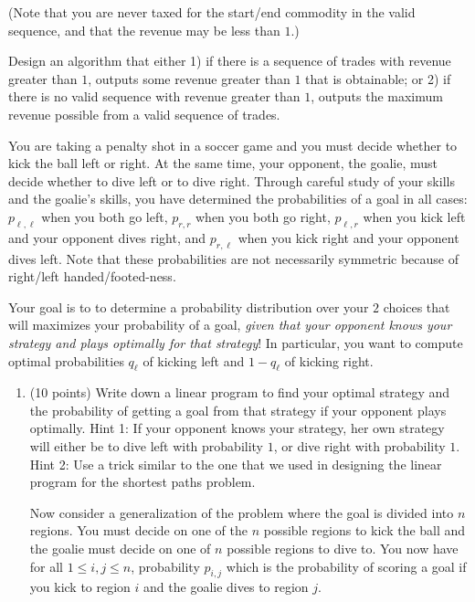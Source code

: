 \documentclass[11pt]{article}
\begin{document}
\begin{enumerate}
\begin{enumerate}
(Note that you are never taxed for the start/end commodity in the valid sequence, and that the revenue may be less than $1$.)

Design an algorithm that either 1) if there is a sequence of trades with revenue greater than $1$, outputs some revenue greater than $1$ that is obtainable; or 2) if there is no valid sequence with revenue greater than $1$, outputs the maximum revenue possible from a valid sequence of trades.

\end{enumerate}




You are taking a penalty shot in a soccer game and you must decide whether to kick the ball left or right.  At the same time, your opponent, the goalie, must decide whether to dive left or to dive right.  Through careful study of your skills and the goalie's skills, you have determined the probabilities of a goal in all cases: $p_{\ell,\ell}$ when you both go left, $p_{r,r}$ when you both go right, $p_{\ell,r}$ when you kick left and your opponent dives right, and $p_{r,\ell}$ when you kick right and your opponent dives left.  Note that these probabilities are not necessarily symmetric because of right/left handed/footed-ness.

Your goal is to to determine a probability distribution over your $2$ choices that will maximizes your probability of a goal,  \emph{given that your opponent knows your strategy and plays optimally for that strategy}!  In particular, you want to compute optimal probabilities $q_{\ell}$ of kicking left and $1-q_{\ell}$ of kicking right.

\begin{enumerate}

\item (10 points) Write down a linear program to find your optimal strategy and the probability of getting a goal from that strategy if your opponent plays optimally.  Hint 1: If your opponent knows your strategy, her own strategy will either be to dive left with probability $1$, or dive right with probability $1$.   Hint 2: Use a trick similar to the one that we used in designing the linear program for the shortest paths problem.  

\pagebreak

Now consider a generalization of the problem where the goal is divided into $n$ regions.  You must decide on one of the $n$ possible regions to kick the ball and the goalie must decide on one of $n$ possible regions to dive to.  You now have for all $1 \leq i,j \leq n$, probability $p_{i,j}$ which is the probability of scoring a goal if you kick to region $i$ and the goalie dives to region $j$.


\end{enumerate}
\end{enumerate}
\end{document}
